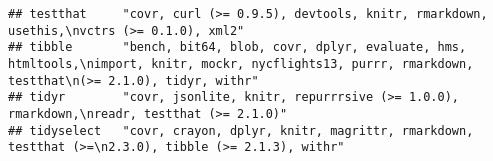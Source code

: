 \documentclass[]{book}
\begin{document}
\begin{verbatim}
## testthat     "covr, curl (>= 0.9.5), devtools, knitr, rmarkdown, usethis,\nvctrs (>= 0.1.0), xml2"                                                                                                                                                                                                                                                                                                                                                                                                                                                                                                                                                                                                                     
## tibble       "bench, bit64, blob, covr, dplyr, evaluate, hms, htmltools,\nimport, knitr, mockr, nycflights13, purrr, rmarkdown, testthat\n(>= 2.1.0), tidyr, withr"                                                                                                                                                                                                                                                                                                                                                                                                                                                                                                                                                    
## tidyr        "covr, jsonlite, knitr, repurrrsive (>= 1.0.0), rmarkdown,\nreadr, testthat (>= 2.1.0)"                                                                                                                                                                                                                                                                                                                                                                                                                                                                                                                                                                                                                   
## tidyselect   "covr, crayon, dplyr, knitr, magrittr, rmarkdown, testthat (>=\n2.3.0), tibble (>= 2.1.3), withr"                                                                                                                                                                                                                                                                                                                                                                                                                                                                                                                                                                                                         

\end{verbatim}
\end{document}

